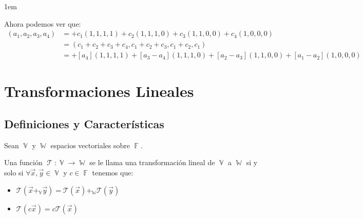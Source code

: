 \documentclass[12pt, fleqn]{report}                             %
\newenvironment{SmallIndentation}[1][0.75em]                    %
        {\begin{adjustwidth}{#1}{}\begin{footnotesize}}             %
        {\end{footnotesize}\end{adjustwidth}}                       %
\theoremstyle{break}                                            %
\DeclareMathOperator \GenericField {\mathbb{F}}                 %
\DeclareMathOperator \VectorSet    {\mathbb{V}}                 %
\DeclareMathOperator \SubVectorSet {\mathbb{W}}                 %
\DeclareMathOperator \LinTrans {\mathcal{T}}                    %
\newcommand{\Wrap}[1]    {\left( #1 \right)}                    %
\newcommand{\FnLinTrans}[1]{\mathcal{T}\Wrap{#1}}               %
\begin{document}
\begin{itemize}
\begin{SmallIndentation}[1em]
                            Ahora podemos ver que:
                            \begin{align*}
                                (a_1, a_2, a_3, a_4)
                                    &= 
                                        + c_1 (1, 1, 1, 1)
                                        + c_2 (1, 1, 1, 0)
                                        + c_3 (1, 1, 0, 0)
                                        + c_4 (1, 0, 0, 0)                                  \\
                                    &= 
                                        (c_1+c_2+c_3+c_4, c_1+c_2+c_3, c_1+c_2, c_1)        \\
                                    &= 
                                        + [a_4]       (1, 1, 1, 1)
                                        + [a_3 - a_4] (1, 1, 1, 0)
                                        + [a_2 - a_3] (1, 1, 0, 0)
                                        + [a_1 - a_2] (1, 0, 0, 0)
                            \end{align*}

                        \end{SmallIndentation}

                \end{itemize}
                        


    \chapter{Transformaciones Lineales}


        \clearpage
        \section{Definiciones y Características}


            Sean $\VectorSet$ y $\SubVectorSet$ espacios vectoriales sobre $\GenericField$.

            Una función $\LinTrans: \VectorSet \to \SubVectorSet$ se le llama una transformación lineal
            de $\VectorSet$ a $\SubVectorSet$
            si y solo si $\forall \vec x, \vec y \in \VectorSet$ y $c \in \GenericField$ tenemos que:
            \begin{itemize}
                \item $\FnLinTrans{\vec x +_{\VectorSet} \vec y} 
                            = \FnLinTrans{\vec x} +_{\SubVectorSet} \FnLinTrans{\vec y}$
                \item $\FnLinTrans{c\vec x} = c\FnLinTrans{\vec x}$
            \end{itemize}
\end{document}
